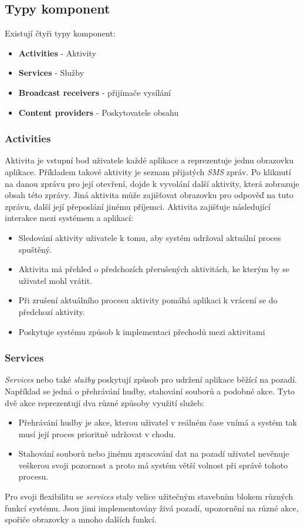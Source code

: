     \subsection{Typy komponent}
    Existují čtyři typy komponent:
    \begin{itemize}
        \item \textbf{Activities} - Aktivity
        \item \textbf{Services} - Služby
        \item \textbf{Broadcast receivers} - přijímače vysílání
        \item \textbf{Content providers} - Poskytovatele obsahu
    \end{itemize}

        \subsubsection{Activities}
        Aktivita je vstupní bod uživatele každé aplikace a reprezentuje jednu obrazovku aplikace. Příkladem takové aktivity je seznam přijatých \emph{SMS} zpráv. Po kliknutí na danou zprávu pro její otevření, dojde k vyvolání další aktivity, která zobrazuje obsah této zprávy. Jiná aktivita může zajišťovat obrazovku pro odpověď na tuto zprávu, další její přeposlání jinému příjemci. Aktivita zajišťuje následující interakce mezi systémem a aplikací:
        \begin{itemize}
            \item Sledování aktivity uživatele k tomu, aby systém udržoval aktuální proces spuštěný.
            \item Aktivita má přehled o předchozích přerušených aktivitách, ke kterým by se uživatel mohl vrátit.
            \item Při zrušení aktuálního procesu aktivity pomáhá aplikaci k vrácení se do předchozí aktivity.
            \item Poskytuje systému způsob k implementaci přechodů mezi aktivitami
        \end{itemize}

        \subsubsection{Services}
        \emph{Services} nebo také \emph{služby} poskytují způsob pro udržení aplikace běžící na pozadí. Například se jedná o přehrávání hudby, stahování souborů a podobné akce. Tyto dvě akce reprezentují dva různé způsoby využití služeb:
        \begin{itemize}
            \item Přehrávání hudby je akce, kterou uživatel v reálném čase vnímá a systém tak musí její proces prioritně udržovat v chodu.
            \item Stahování souborů nebo jinému zpracování dat na pozadí uživatel nevěnuje veškerou svoji pozornost a proto má systém větší volnost při správě tohoto procesu.
        \end{itemize}
        Pro svoji flexibilitu se \emph{services} staly velice užitečným stavebním blokem různých funkcí systému. Jsou jimi implementovány živá pozadí, upozornění na různé akce, spořiče obrazovky a mnoho dalších funkcí.
        
